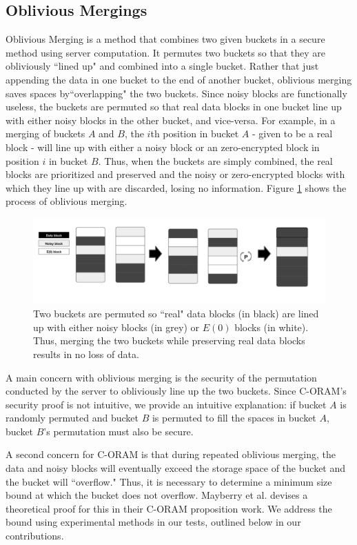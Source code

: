 \documentclass[12pt, oneside]{article}   	%
\begin{document}
\subsection{Oblivious Mergings}
Oblivious Merging is a method that combines two given buckets in a secure method using server computation. It permutes two buckets so that they are obliviously ``lined up" and combined into a single bucket. Rather that just appending the data in one bucket to the end of another bucket, oblivious merging saves spaces by``overlapping" the two buckets. Since noisy blocks are functionally useless, the buckets are permuted so that real data blocks in one bucket line up with either noisy blocks in the other bucket, and vice-versa. For example, in a merging of buckets $A$ and $B$, the $i$th position in bucket $A$ - given to be a real block - will line up with either a noisy block or an zero-encrypted block in position $i$ in bucket $B$. Thus, when the buckets are simply combined, the real blocks are prioritized and preserved and the noisy or zero-encrypted blocks with which they line up with are discarded, losing no information. Figure \ref{fig:merge} shows the process of oblivious merging. 

\begin{figure}[h!]
  \includegraphics[width=\linewidth]{merge}
  \caption{Two buckets are permuted so ``real" data blocks (in black) are lined up with either noisy blocks (in grey) or $E (0)$ blocks (in white). Thus, merging the two buckets while preserving real data blocks results in no loss of data.}
  \label{fig:merge}
\end{figure}

A main concern with oblivious merging is the security of the permutation conducted by the server to obliviously line up the two buckets. Since C-ORAM's security proof is not intuitive, we provide an intuitive explanation: if bucket $A$ is randomly permuted and bucket $B$ is permuted to fill the spaces in bucket $A$, bucket $B$'s permutation must also be secure. 

A second concern for C-ORAM is that during repeated oblivious merging, the data and noisy blocks will eventually exceed the storage space of the bucket and the bucket will ``overflow." Thus, it is necessary to determine a minimum size bound at which the bucket does not overflow. Mayberry et al. devises a theoretical proof for this in their C-ORAM proposition work. We address the bound using experimental methods in our tests, outlined below in our contributions.
\end{document}
